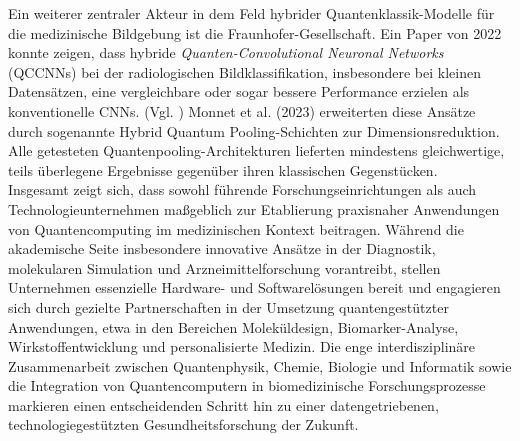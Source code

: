 Ein weiterer zentraler Akteur in dem Feld hybrider Quantenklassik-Modelle für die medizinische Bildgebung ist die Fraunhofer-Gesellschaft. Ein Paper von 2022 konnte zeigen, dass hybride \textit{Quanten-Convolutional Neuronal Networks} (QCCNNs) bei der radiologischen Bildklassifikation, insbesondere bei kleinen Datensätzen, eine vergleichbare oder sogar bessere Performance erzielen als konventionelle CNNs. (Vgl. \cite{matic_quantum-classical_2022})
Monnet et al. (2023) erweiterten diese Ansätze durch sogenannte Hybrid Quantum Pooling-Schichten zur Dimensionsreduktion. Alle getesteten Quantenpooling-Architekturen lieferten mindestens gleichwertige, teils überlegene Ergebnisse gegenüber ihren klassischen Gegenstücken.\\

Insgesamt zeigt sich, dass sowohl führende Forschungseinrichtungen als auch Technologieunternehmen maßgeblich zur Etablierung praxisnaher Anwendungen von Quantencomputing im medizinischen Kontext beitragen. Während die akademische Seite insbesondere innovative Ansätze in der Diagnostik, molekularen Simulation und Arzneimittelforschung vorantreibt, stellen Unternehmen essenzielle Hardware- und Softwarelösungen bereit und engagieren sich durch gezielte Partnerschaften in der Umsetzung quantengestützter Anwendungen, etwa in den Bereichen Moleküldesign, Biomarker-Analyse, Wirkstoffentwicklung und personalisierte Medizin. Die enge interdisziplinäre Zusammenarbeit zwischen Quantenphysik, Chemie, Biologie und Informatik sowie die Integration von Quantencomputern in biomedizinische Forschungsprozesse markieren einen entscheidenden Schritt hin zu einer datengetriebenen, technologiegestützten Gesundheitsforschung der Zukunft. \\\\

